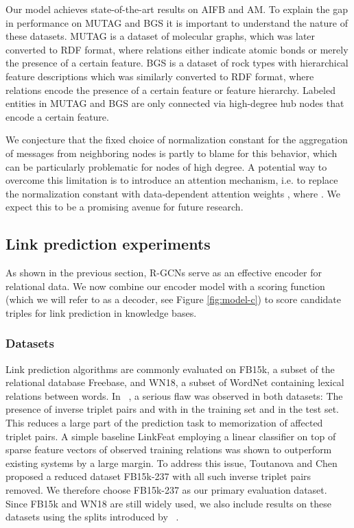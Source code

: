 \documentclass[letterpaper]{article} \usepackage{aaai18}  \usepackage{times}  \usepackage{helvet}  \usepackage{courier}  \usepackage{url}  \usepackage{graphicx}  \frenchspacing
\newcommand{\citet}[1]{\citeauthor{#1}~\shortcite{#1}}
\begin{document}
Our model achieves state-of-the-art results on AIFB and AM. To explain the gap in performance on MUTAG and BGS it is important to understand the nature of these datasets. MUTAG is a dataset of molecular graphs, which was later converted to RDF format, where relations either indicate atomic bonds or merely the presence of a certain feature. BGS is a dataset of rock types with hierarchical feature descriptions which was similarly converted to RDF format, where relations encode the presence of a certain feature or feature hierarchy. Labeled entities in MUTAG and BGS are only connected via high-degree hub nodes that encode a certain feature.

We conjecture that the fixed choice of normalization constant for the aggregation of messages from neighboring nodes is partly to blame for this behavior, which can be particularly problematic for nodes of high degree. A potential way to overcome this limitation is to introduce an attention mechanism, i.e. to replace the normalization constant  with data-dependent attention weights , where . We expect this to be a promising avenue for future research.
 
\subsection{Link prediction experiments}
As shown in the previous section, R-GCNs serve as an effective encoder for relational data. We now combine our encoder model with a scoring function (which we will refer to as a decoder, see Figure \ref{fig:model-c}) to score candidate triples for link prediction in knowledge bases.

\subsubsection{Datasets}
Link prediction algorithms are commonly evaluated on FB15k, a subset of the relational database Freebase, and WN18, a subset of WordNet containing lexical relations between words. In \citet{toutanova2015observed}, a serious flaw was observed in both datasets: The presence of inverse triplet pairs  and  with  in the training set and  in the test set. This reduces a large part of the prediction task to memorization of affected triplet pairs. A simple baseline LinkFeat employing a linear classifier on top of sparse feature vectors of observed training relations was shown to outperform existing systems by a large margin. To address this issue, Toutanova and Chen proposed a reduced dataset FB15k-237 with all such inverse triplet pairs removed. We therefore choose FB15k-237 as our primary evaluation dataset. Since FB15k and WN18 are still widely used, we also include results on these datasets using the splits introduced by \citet{bordes2013translating}.
\end{document}
